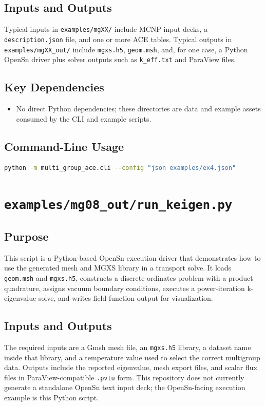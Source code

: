 \documentclass[11pt]{article}
\begin{document}
\subsection*{Inputs and Outputs}
Typical inputs in \texttt{examples/mgXX/} include MCNP input decks, a \texttt{description.json} file, and one or more ACE tables. Typical outputs in \texttt{examples/mgXX\_out/} include \texttt{mgxs.h5}, \texttt{geom.msh}, and, for one case, a Python OpenSn driver plus solver outputs such as \texttt{k\_eff.txt} and ParaView files.

\subsection*{Key Dependencies}
\begin{itemize}
\item No direct Python dependencies; these directories are data and example assets consumed by the CLI and example scripts.
\end{itemize}

\subsection*{Command-Line Usage}
\begin{lstlisting}[language=bash]
python -m multi_group_ace.cli --config "json examples/ex4.json"
\end{lstlisting}

\section{\texttt{examples/mg08\_out/run\_keigen.py}}

\subsection*{Purpose}
This script is a Python-based OpenSn execution driver that demonstrates how to use the generated mesh and MGXS library in a transport solve. It loads \texttt{geom.msh} and \texttt{mgxs.h5}, constructs a discrete ordinates problem with a product quadrature, assigns vacuum boundary conditions, executes a power-iteration k-eigenvalue solve, and writes field-function output for visualization.

\subsection*{Inputs and Outputs}
The required inputs are a Gmsh mesh file, an \texttt{mgxs.h5} library, a dataset name inside that library, and a temperature value used to select the correct multigroup data. Outputs include the reported eigenvalue, mesh export files, and scalar flux files in ParaView-compatible \texttt{.pvtu} form. This repository does not currently generate a standalone OpenSn text input deck; the OpenSn-facing execution example is this Python script.
\end{document}
